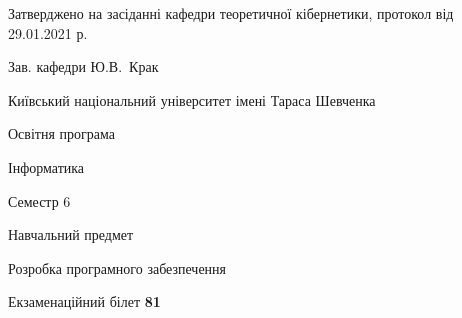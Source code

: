\documentclass[10pt, ukrainian]{article}
\begin{document}
{\vspace{5mm}\smallskip \begin {small} Затверджено на засіданні кафедри теоретичної кібернетики, протокол  від   29.01.2021 р.\par\smallskip\smallskip
{\parbox {6.5 cm}{Зав. кафедри \dotfill Ю.В.~Крак}} \end{small}}
\newpage

{{\begin {small}\par
{ \center  Київський національний університет імені Тараса Шевченка \par}
{\parbox {5 cm}{Освітня програма \hfill}{\parbox {7 cm}{Інформатика \hfill}}\parbox {6 cm}{\hfill Семестр 6}}\par
{\parbox {5 cm} {Навчальний предмет \hfill}\parbox {7 cm}{Розробка програмного забезпечення \hfill}\parbox {6cm}{\hfill}\par}\vspace{-7pt} \end{small}}{\center Екзаменаційний білет \No \textbf
{ 81 }\par}}
\end{document}
